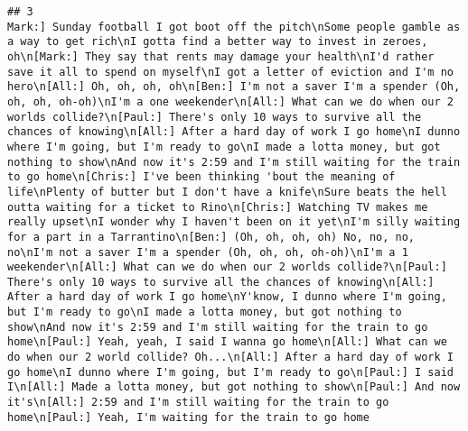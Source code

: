 \documentclass[]{article}
\begin{document}
\begin{verbatim}
## 3                                                                                                                                                                                                                                                                                                                                                                                                                                                                                                                                                                                                                                                                                                                                                                                                                                                                                                                                                                                                                                                                                                                                                                                                                                                      Mark:] Sunday football I got boot off the pitch\nSome people gamble as a way to get rich\nI gotta find a better way to invest in zeroes, oh\n[Mark:] They say that rents may damage your health\nI'd rather save it all to spend on myself\nI got a letter of eviction and I'm no hero\n[All:] Oh, oh, oh, oh\n[Ben:] I'm not a saver I'm a spender (Oh, oh, oh, oh-oh)\nI'm a one weekender\n[All:] What can we do when our 2 worlds collide?\n[Paul:] There's only 10 ways to survive all the chances of knowing\n[All:] After a hard day of work I go home\nI dunno where I'm going, but I'm ready to go\nI made a lotta money, but got nothing to show\nAnd now it's 2:59 and I'm still waiting for the train to go home\n[Chris:] I've been thinking 'bout the meaning of life\nPlenty of butter but I don't have a knife\nSure beats the hell outta waiting for a ticket to Rino\n[Chris:] Watching TV makes me really upset\nI wonder why I haven't been on it yet\nI'm silly waiting for a part in a Tarrantino\n[Ben:] (Oh, oh, oh, oh) No, no, no, no\nI'm not a saver I'm a spender (Oh, oh, oh, oh-oh)\nI'm a 1 weekender\n[All:] What can we do when our 2 worlds collide?\n[Paul:] There's only 10 ways to survive all the chances of knowing\n[All:] After a hard day of work I go home\nY'know, I dunno where I'm going, but I'm ready to go\nI made a lotta money, but got nothing to show\nAnd now it's 2:59 and I'm still waiting for the train to go home\n[Paul:] Yeah, yeah, I said I wanna go home\n[All:] What can we do when our 2 world collide? Oh...\n[All:] After a hard day of work I go home\nI dunno where I'm going, but I'm ready to go\n[Paul:] I said I\n[All:] Made a lotta money, but got nothing to show\n[Paul:] And now it's\n[All:] 2:59 and I'm still waiting for the train to go home\n[Paul:] Yeah, I'm waiting for the train to go home

\end{verbatim}
\end{document}
